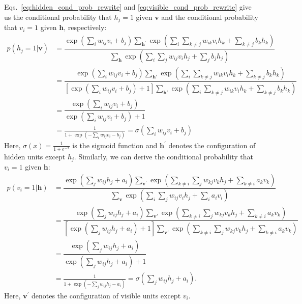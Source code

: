 \documentclass[10pt, a4paper]{article}
\begin{document}
Eqs.~\eqref{eq:hidden_cond_prob_rewrite} and \eqref{eq:visible_cond_prob_rewrite} give us
the conditional probability that $h_j=1$ given $\mathbf{v}$
and the conditional probability that $v_i=1$ given $\mathbf{h}$, respectively:
\begin{align}
  p(h_j=1|\mathbf{v}) &= \dfrac{\exp\left(\sum_i w_{ij} v_i + b_j\right)
  \sum_{\mathbf{h^\prime}} \exp\left(\sum_i\sum_{k\neq j} w_{ik} v_i h_k + \sum_{k\neq j} b_k h_k\right)}
  {\sum_{\mathbf{h}} \exp\left(\sum_i\sum_j w_{ij} v_i h_j + \sum_j b_j h_j\right)} \nonumber \\
  &= \dfrac{\exp\left(\sum_i w_{ij} v_i + b_j\right) \sum_{\mathbf{h'}} \exp\left(\sum_i\sum_{k\neq j} w_{ik} v_i h_k + \sum_{k\neq j} b_k h_k\right)}
   {\left[\exp\left(\sum_i w_{ij} v_i + b_j\right)+1\right] \sum_{\mathbf{h'}} \exp\left(\sum_i\sum_{k\neq j} w_{ik} v_i h_k + \sum_{k\neq j} b_k h_k\right)} \nonumber \\
   &= \dfrac{\exp\left(\sum_i w_{ij} v_i + b_j\right)}{\exp\left(\sum_i w_{ij} v_i + b_j\right) + 1} \nonumber \\
   &= \frac{1}{1 + \exp\left(-\sum_i w_{ij} v_i - b_j\right)} = \sigma\left(\sum_i w_{ij} v_i + b_j\right)
   \label{eq:hidden_cond_prob_final}
\end{align}
Here, $\sigma(x) = \frac{1}{1 + e^{-x}}$ is the sigmoid function and $\mathbf{h^\prime}$ denotes the configuration of hidden units except $h_j$.
Similarly, we can derive the conditional probability that $v_i=1$ given $\mathbf{h}$:
\begin{align}
  p(v_i=1|\mathbf{h}) &= \dfrac{\exp\left(\sum_j w_{ij} h_j + a_i\right)
  \sum_{\mathbf{v^\prime}} \exp\left(\sum_{k\neq i}\sum_j w_{kj} v_k h_j + \sum_{k\neq i} a_k v_k\right)}
  {\sum_{\mathbf{v}} \exp\left(\sum_i\sum_j w_{ij} v_i h_j + \sum_i a_i v_i\right)} \nonumber \\
  &= \dfrac{\exp\left(\sum_j w_{ij} h_j + a_i\right) \sum_{\mathbf{v'}} \exp\left(\sum_{k\neq i}\sum_j w_{kj} v_k h_j + \sum_{k\neq i} a_k v_k\right)}
   {\left[\exp\left(\sum_j w_{ij} h_j + a_i\right)+1\right] \sum_{\mathbf{v'}} \exp\left(\sum_{k\neq i}\sum_j w_{kj} v_k h_j + \sum_{k\neq i} a_k v_k\right)} \nonumber \\
   &= \dfrac{\exp\left(\sum_j w_{ij} h_j + a_i\right)}{\exp\left(\sum_j w_{ij} h_j + a_i\right) + 1} \nonumber \\
   &= \frac{1}{1 + \exp\left(-\sum_j w_{ij} h_j - a_i\right)} = \sigma\left(\sum_j w_{ij} h_j + a_i\right).
   \label{eq:visible_cond_prob_final}
\end{align}
Here, $\mathbf{v^\prime}$ denotes the configuration of visible units except $v_i$.
\end{document}
